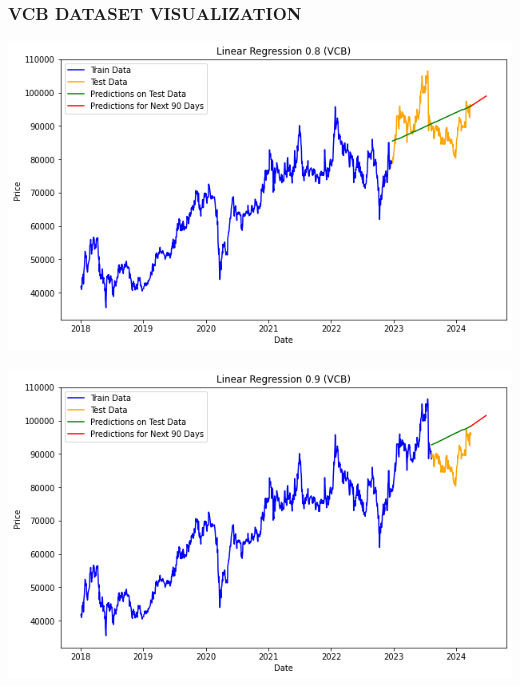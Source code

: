 \documentclass[conference]{IEEEtran}
\begin{document}
\subsubsection{VCB DATASET VISUALIZATION}
\begin{minipage}{0.23\textwidth}
    \centering
    \includegraphics[width=\linewidth]{images/LR/LinearRegression_VCB_90days_82.png}
    \label{fig:image1}
\end{minipage}
\hfill
\begin{minipage}{0.23\textwidth}
    \centering
    \includegraphics[width=\linewidth]{images/LR/LinearRegression_VCB_90days_91.png}
    \label{fig:image2}
\end{minipage}
\end{document}
